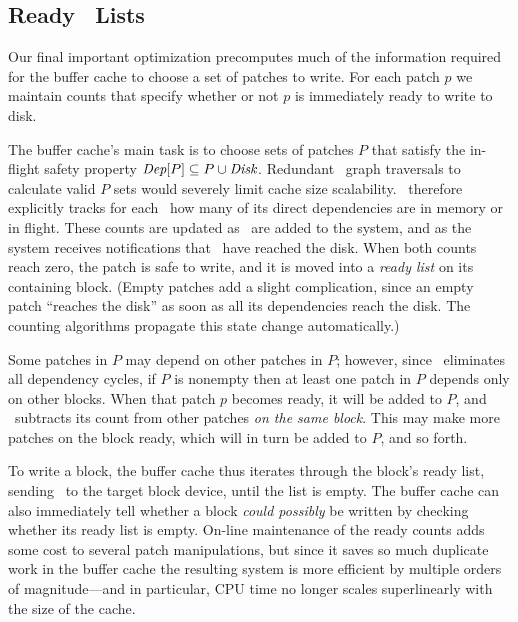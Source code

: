 
\subsection{Ready \ChDesc\ Lists}
\label{sec:patch:readylist}

\newcommand{\PReady}[1]{\ensuremath{#1.\textit{ready}}}

Our final important optimization precomputes much of the information
required for the buffer cache to choose a set of patches to write.
%
For each patch $p$ we maintain counts that specify whether or not $p$ is
immediately ready to write to disk.


The buffer cache's main task is to choose sets of patches $P$ that satisfy
the in-flight safety property $\PDepset{P} \subseteq P \cup \PDisk$.
%
Redundant \chdesc\ graph traversals to calculate valid $P$ sets would
severely limit cache size scalability.
%
\Kudos\ therefore explicitly tracks for each \chdesc\ how many of its
direct dependencies are in memory or in flight.
%
These counts are updated as \patches\ are added to the system, and as the
system receives notifications that \patches\ have reached the disk.
%
When both counts reach zero, the patch is safe to write, and it is moved
into a \emph{ready list} on its containing block.
%
(Empty patches add a slight complication, since an empty patch ``reaches
the disk'' as soon as all its dependencies reach the disk.  The counting
algorithms propagate this state change automatically.)


Some patches in $P$ may depend on other patches in $P$; however, since
\Kudos\ eliminates all dependency cycles, if $P$ is nonempty then at least
one patch in $P$ depends only on other blocks.
%
When that patch $p$ becomes ready, it will be added to $P$, and \Kudos\
subtracts its count from other patches \emph{on the same block}.
%
This may make more patches on the block ready, which will in turn be added
to $P$, and so forth.


To write a block, the buffer cache thus iterates through the block's ready
list, sending \chdescs\ to the target block device, until the list is
empty. 
%
The buffer cache can also immediately tell whether a block \emph{could
possibly} be written by checking whether its ready list is empty.
%
On-line maintenance of the ready counts adds some cost to several patch
manipulations, but since it saves so much duplicate work in the buffer
cache the resulting system is more efficient by multiple orders of
magnitude---and in particular, CPU time no longer scales superlinearly with
the size of the cache.


